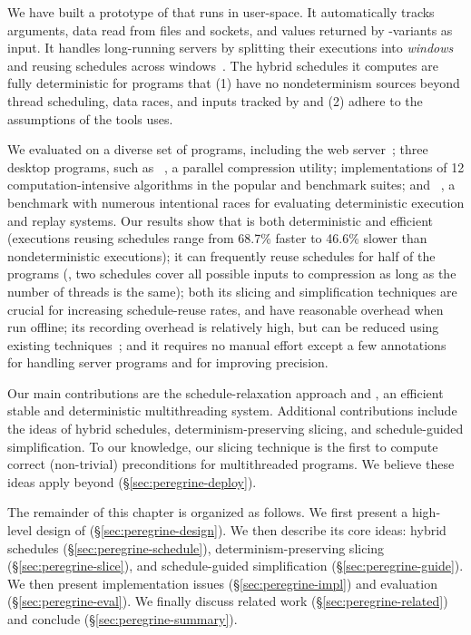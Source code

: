 We have built a prototype of \peregrine that runs in user-space.
It automatically tracks 
arguments, data read from files and sockets, and values
returned by -variants as input.  It handles long-running servers by
splitting their executions into \emph{windows} and
reusing schedules across windows~\cite{cui:tern:osdi10}.
The hybrid schedules it computes are fully deterministic for programs that
(1) have no nondeterminism sources beyond thread scheduling, data races, and
inputs tracked by \peregrine and (2) adhere to the assumptions of the tools
\peregrine uses.

We evaluated \peregrine on a diverse set of \peregrinenprog programs, including
the
\apache web server~\cite{apache}; three desktop programs, such as
\pbzip~\cite{pbzip2}, a parallel compression utility; implementations of
12 computation-intensive algorithms in the popular \splash and \parsec
benchmark suites; and \racey~\cite{racy-stress}, a benchmark with numerous
intentional races for evaluating deterministic execution and replay
systems.  Our results show that \peregrine is both deterministic and efficient
(executions reusing schedules range from 68.7\% faster to 46.6\% slower
than nondeterministic executions); it can frequently reuse schedules for
half of the programs (\eg, two schedules cover all possible inputs to
\pbzip compression as long as the number of threads is the same); both its
slicing and
simplification techniques are crucial for increasing schedule-reuse rates,
and have reasonable overhead when run offline; its recording overhead
is relatively high, but can be reduced using existing
techniques~\cite{idna:vee06}; and it requires no manual effort except a
few annotations for handling server programs and for improving precision.

Our main contributions are the schedule-relaxation approach and \peregrine, an
 efficient stable and deterministic multithreading system.  Additional 
contributions include
the ideas of hybrid schedules, determinism-preserving slicing, and
schedule-guided simplification.  To our knowledge, our slicing technique
is the first to compute correct (non-trivial) preconditions for
multithreaded programs.
We believe these ideas apply beyond \peregrine (\S\ref{sec:peregrine-deploy}).

The remainder of this chapter is organized as follows.  We first present a
high-level design of \peregrine (\S\ref{sec:peregrine-design}).  We then
describe its
core ideas: hybrid schedules (\S\ref{sec:peregrine-schedule}),
determinism-preserving slicing (\S\ref{sec:peregrine-slice}), and
schedule-guided
simplification (\S\ref{sec:peregrine-guide}).  We then present implementation
issues
(\S\ref{sec:peregrine-impl}) and evaluation (\S\ref{sec:peregrine-eval}).  We
finally discuss
related work (\S\ref{sec:peregrine-related}) and conclude
(\S\ref{sec:peregrine-summary}).
